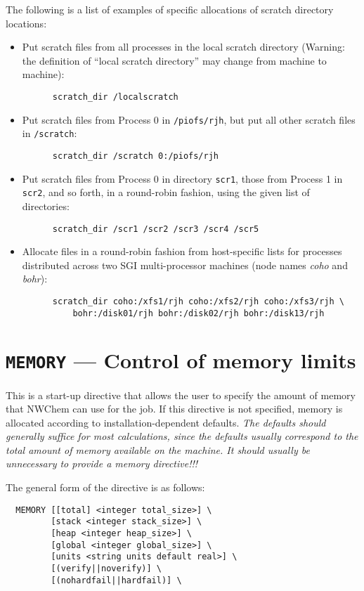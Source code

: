 The following is a list of examples of specific allocations of scratch
directory locations:
\begin{itemize}
\item Put scratch files from all processes in the local scratch directory 
(Warning: the definition of ``local scratch directory'' may change from 
machine to machine):
\begin{verbatim}
      scratch_dir /localscratch
\end{verbatim}
\item Put scratch files from Process 0 in \verb+/piofs/rjh+, but put all 
other scratch files in \verb+/scratch+:
\begin{verbatim}
      scratch_dir /scratch 0:/piofs/rjh
\end{verbatim}
\item Put scratch files from Process 0 in directory \verb+scr1+, those from
Process 1 in \verb+scr2+, and so forth, in a round-robin fashion, using the
given list of directories:
\begin{verbatim}
      scratch_dir /scr1 /scr2 /scr3 /scr4 /scr5
\end{verbatim}
\item Allocate files in a round-robin fashion from
  host-specific lists for processes distributed across two
 SGI multi-processor machines (node names {\em coho} and {\em bohr}):
\begin{verbatim}
      scratch_dir coho:/xfs1/rjh coho:/xfs2/rjh coho:/xfs3/rjh \
          bohr:/disk01/rjh bohr:/disk02/rjh bohr:/disk13/rjh
\end{verbatim}
\end{itemize}

\section{{\tt MEMORY} --- Control of memory limits}

This is a start-up directive that allows the user to specify the
amount of memory that NWChem can use for the job.  If this directive
is not specified, memory is allocated according to
installation-dependent defaults.  {\em The defaults should generally
  suffice for most calculations, since the defaults usually correspond
  to the total amount of memory available on the machine.  It should
usually be unnecessary to provide a memory directive!!!} 

The general form of the directive is as follows:

\begin{verbatim}
  MEMORY [[total] <integer total_size>] \
         [stack <integer stack_size>] \
         [heap <integer heap_size>] \
         [global <integer global_size>] \
         [units <string units default real>] \
         [(verify||noverify)] \
         [(nohardfail||hardfail)] \
\end{verbatim}

